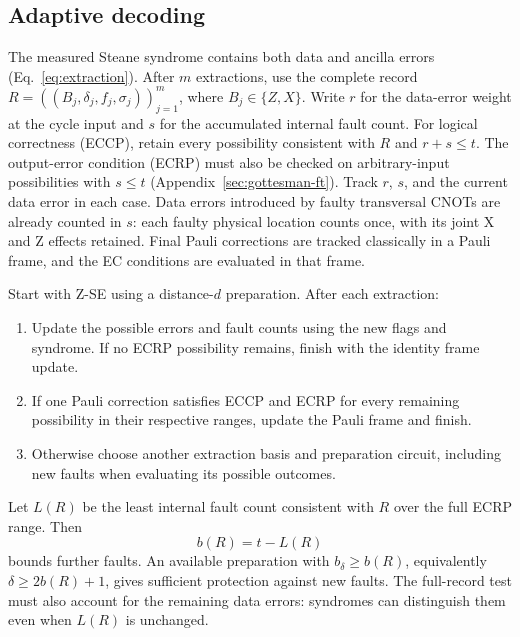 \documentclass[11pt,a4paper]{article}
\theoremstyle{definition}
\begin{document}
\subsection{Adaptive decoding}
\label{sec:adaptive-decoding}

The measured Steane syndrome contains both data and ancilla errors
(Eq.~\eqref{eq:extraction}). After $m$ extractions, use the complete record
$R=((B_j,\delta_j,f_j,\sigma_j))_{j=1}^{m}$, where $B_j\in\{Z,X\}$.
Write $r$ for the data-error weight at the cycle input and $s$ for the
accumulated internal fault count. For logical correctness (ECCP), retain every
possibility consistent with $R$ and $r+s\leq t$. The output-error
condition (ECRP) must also be checked on arbitrary-input possibilities
with $s\leq t$ (Appendix~\ref{sec:gottesman-ft}). Track $r$, $s$, and the
current data error in each case.
Data errors introduced by faulty transversal CNOTs are already counted
in $s$: each faulty physical location counts once, with its joint X and
Z effects retained.
Final Pauli corrections are tracked classically in a Pauli frame, and
the EC conditions are evaluated in that frame.

Start with Z-SE using a distance-$d$ preparation. After each extraction:
\begin{enumerate}
    \item Update the possible errors and fault counts using the new
    flags and syndrome. If no ECRP possibility remains, finish with the
    identity frame update.
    \item If one Pauli correction satisfies ECCP and ECRP for every
    remaining possibility in their respective ranges, update the Pauli
    frame and finish.
    \item Otherwise choose another extraction basis and preparation
    circuit, including new faults when evaluating its possible outcomes.
\end{enumerate}

Let $L(R)$ be the least internal fault count consistent with $R$ over the
full ECRP range. Then
\begin{equation}
    b(R)=t-L(R)
    \label{eq:remaining-faults}
\end{equation}
bounds further faults. An available preparation with $b_\delta\geq b(R)$,
equivalently $\delta\geq2b(R)+1$, gives sufficient protection against new
faults. The full-record test must also account for the remaining data errors:
syndromes can distinguish them even when $L(R)$ is unchanged.
\end{document}
